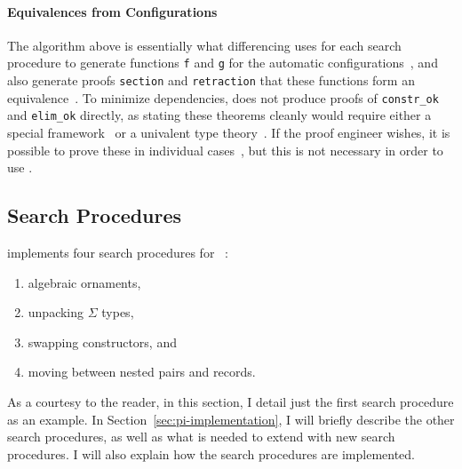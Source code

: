 \paragraph{Equivalences from Configurations}
The algorithm above is essentially what differencing uses for each search procedure to generate functions \lstinline{f} and \lstinline{g} for the automatic configurations~\href{https://github.com/uwplse/pumpkin-pi/blob/v2.0.0/plugin/src/automation/search/search.ml}{}, %
and also generate proofs \lstinline{section} and \lstinline{retraction} that these functions form an equivalence~\href{https://github.com/uwplse/pumpkin-pi/blob/v2.0.0/plugin/src/automation/search/equivalence.ml}{}. %
To minimize dependencies, \toolnamec does not produce proofs of \lstinline{constr_ok} and \lstinline{elim_ok} directly,
as stating these theorems cleanly would require either a special framework~\cite{tabareau2017equivalences}
or a univalent type theory~\cite{univalent2013homotopy}.
If the proof engineer wishes, it is possible to prove these in individual cases~\href{https://github.com/uwplse/pumpkin-pi/blob/v2.0.0/plugin/coq/playground/arbitrary.v}{}, %
but this is not necessary in order to use \toolnamec. %

\subsection{Search Procedures}
\label{sec:proc}

\toolnamec implements four search procedures for ~\href{https://github.com/uwplse/pumpkin-pi/blob/v2.0.0/plugin/src/automation/lift/liftconfig.ml}{}:

\begin{enumerate}
\item algebraic ornaments,
\item unpacking $\Sigma$ types,
\item swapping constructors, and
\item moving between nested pairs and records.
\end{enumerate}
As a courtesy to the reader, in this section, I detail just the first search procedure as an example.
In Section~\ref{sec:pi-implementation}, I will briefly describe the other search procedures,
as well as what is needed to extend \toolnamec with new search procedures.
I will also explain how the search procedures are implemented.

